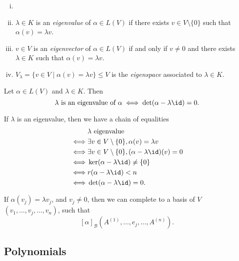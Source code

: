 \documentclass[12pt]{article}
\begin{document}
\begin{definition}
	\begin{enumerate}[(i)]
		\item[]
		\item $\lambda \in K$ is an \textit{eigenvalue} of $\alpha \in L(V)$ if there exists $v \in V\setminus\{0\}$ such that $\alpha(v) = \lambda v$.
		\item $v \in V$ is an \textit{eigenvector} of $\alpha \in L(V)$ if and only if $v \neq 0$ and there exists $\lambda \in K$ such that $\alpha(v) = \lambda v$.
		\item $V_{\lambda} = \{v \in V \mid \alpha(v) = \lambda v\} \leq V$ is the \textit{eigenspace} associated to $\lambda \in K$.
	\end{enumerate}
\end{definition}

\begin{lemma}
	Let $\alpha \in L(V)$ and $\lambda \in K$. Then
	\[
		\lambda \text{ is an eigenvalue of } \alpha \iff \det(\alpha - \lambda \id) = 0
	.\]
\end{lemma}

\begin{proofbox}
	If $\lambda$ is an eigenvalue, then we have a chain of equalities
	\begin{align*}
		& \lambda \text{ eigenvalue} \\
		\iff& \exists v \in V\setminus\{0\}, \alpha(v) = \lambda v \\
			\iff& \exists v \in V \setminus\{0\}, (\alpha - \lambda \id)(v) = 0 \\
			\iff& \ker(\alpha - \lambda \id) \neq \{0\} \\
				\iff& r(\alpha - \lambda \id) < n \\
					\iff& \det(\alpha - \lambda \id) = 0.
	\end{align*}
\end{proofbox}

\begin{remark}
	If $\alpha(v_j) = \lambda v_j$, and $v_j \neq 0$, then we can complete to a basis of $V$ $(v_1, \ldots, v_j, \ldots, v_n)$, such that
	\[
		[\alpha]_{\mathcal{B}} (A^{(1)}, \ldots, e_j, \ldots, A^{(n)})
	.\]
\end{remark}

\subsection{Polynomials}%
\label{sub:polynomials}
\end{document}
